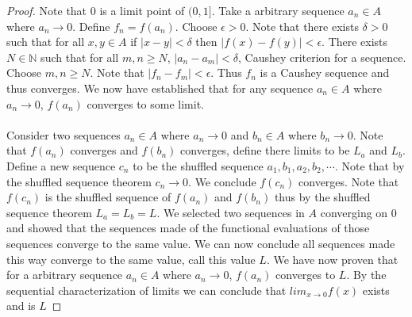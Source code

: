 \documentclass[12pt]{article}
\theoremstyle{homework}
\begin{document}
\begin{proof}
Note that 0 is a limit point of $(0,1]$.  Take a arbitrary sequence $a_n\in A$ where $a_n\rightarrow 0$.  Define $f_n=f(a_n)$.  Choose $\epsilon>0$.  Note that there exists $\delta>0$ such that for all $x,y\in A$ if $|x-y|<\delta$ then $|f(x)-f(y)|<\epsilon$.  There exists $N\in \mathbb{N}$ such that for all $m, n\geq N$, $|a_n-a_m|<\delta$, Caushey criterion for a sequence.  Choose $m, n\geq N$.  Note that $|f_n-f_m|<\epsilon$.  Thus $f_n$ is a Caushey sequence and thus converges.  We now have established that for any sequence $a_n\in A$ where $a_n\rightarrow 0$, $f(a_n)$ converges to some limit.\\\\
Consider two sequences $a_n\in A$ where $a_n\rightarrow 0$ and $b_n\in A$ where $b_n\rightarrow 0$.  Note that $f(a_n)$ converges and $f(b_n)$ converges, define there limits to be $L_a$ and $L_b$.  Define a new sequence $c_n$ to be the shuffled sequence $a_1,b_1,a_2,b_2,\cdots$.  Note that by the shuffled sequence theorem $c_n\rightarrow 0$.  We conclude $f(c_n)$ converges.  Note that $f(c_n)$ is the shuffled sequence of $f(a_n)$ and $f(b_n)$ thus by the shuffled sequence theorem $L_a=L_b=L$.  We selected two sequences in $A$ converging on 0 and showed that the sequences made of the functional evaluations of those sequences converge to the same value.  We can now conclude all sequences made this way converge to the same value, call this value $L$.  We have now proven that for a arbitrary sequence $a_n\in A$ where $a_n\rightarrow 0$, $f(a_n)$ converges to $L$.  By the sequential characterization of limits we can conclude that $lim_{x\rightarrow 0} f (x)$ exists and is $L$
\end{proof}
\end{document}
